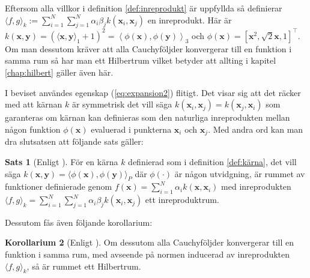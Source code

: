 \documentclass[a4paper, 12pt]{report}
\theoremstyle{definition}
\newtheorem{thm}{Sats}[section]
\newtheorem{cor}[thm]{Korollarium}
\theoremstyle{remark}
\newcommand{\bfx}{\mathbf{x}}
\newcommand{\bfy}{\mathbf{y}}
\begin{document}
\begin{enumerate}

\end{enumerate}
Eftersom alla villkor i definition \ref{def:inreprodukt} är uppfyllda så definierar $\langle f, g\rangle_k:=\sum_{i=1}^{N}\sum_{j=1}^{N}\alpha_i\beta_jk\left(\bfx_i, \bfx_j\right)$ en inreprodukt. Här är $k\left(\bfx, \bfy\right)=\left(\langle \bfx, \bfy\rangle_1 + 1\right)^2= \left\langle \phi\left(\bfx\right),  \phi\left(\bfy\right)\right\rangle_3$ och $\phi\left(\bfx\right)=\left[\bfx^2, \sqrt{2}\bfx, 1 \right]^\intercal$. Om man dessutom kräver att alla Cauchyföljder konvergerar till en funktion i samma rum så har man ett Hilbertrum vilket betyder att allting i kapitel \ref{chap:hilbert} gäller även här.

I beviset användes egenskap (\ref{eq:expansion2}) flitigt. Det visar sig att det räcker med att kärnan $k$ är symmetrisk det vill säga $k\left(\bfx_i, \bfx_j\right)=k\left(\bfx_j, \bfx_i\right)$ som garanteras om kärnan kan definieras som den naturliga inreprodukten mellan någon funktion $\phi\left(\mathbf{x}\right)$ evaluerad i punkterna $\bfx_i$ och $\bfx_j$. Med andra ord kan man dra slutsatsen att följande sats gäller:
\begin{thm}[Enligt \cite{LearningKernels}]\label{thm:kärnainreprodukt}
	För en kärna $k$ definierad som i definition \ref{def:kärna}, det vill säga $k\left(\bfx, \bfy\right)=\langle \phi\left(\bfx\right), \phi\left(\bfy\right)\rangle_P$ där $\phi\left(\cdot\right)$ är någon utvidgning, är rummet av funktioner definierade genom $f\left(\bfx\right) = \sum_{i=1}^{N}\alpha_ik\left(\bfx, \bfx_i\right)$ med inreprodukten $\langle f, g\rangle_k = \sum_{i=1}^{N}\sum_{j=1}^{N} \alpha_i\beta_jk\left(\bfx_i, \bfx_j\right)$ ett inreproduktrum.
\end{thm}
Dessutom fås även följande korollarium:
\begin{cor}[Enligt \cite{LearningKernels}]\label{cor:kärnahilbert}
	Om dessutom alla Cauchyföljder konvergerar till en funktion i samma rum, med avseende på normen inducerad av inreprodukten $\langle f, g\rangle_k$, så är rummet ett Hilbertrum.
\end{cor}
\end{document}
